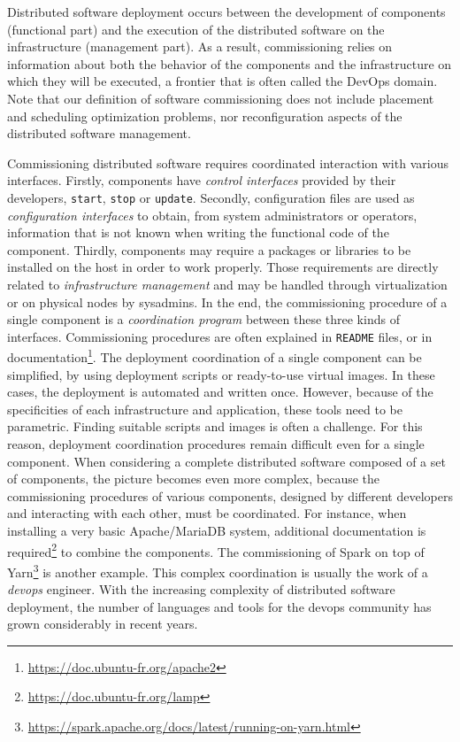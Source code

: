Distributed software deployment occurs between the development of
components (functional part) and the execution of the distributed
software on the infrastructure (management part). As a result,
commissioning relies on information about both the behavior of the
components and the infrastructure on which they will be executed, a
frontier that is often called the DevOps domain. Note that our
definition of software commissioning does not include placement and
scheduling optimization problems, nor reconfiguration aspects of the
distributed software management.


Commissioning distributed software requires coordinated interaction
with various interfaces. Firstly, components have \emph{control
  interfaces} provided by their developers, \eg \texttt{start},
\texttt{stop} or \texttt{update}. Secondly, configuration files are
used as \emph{configuration interfaces} to obtain, from system
administrators or operators, information that is not known when
writing the functional code of the component. Thirdly, components may
require a packages or libraries to be installed on the host in order
to work properly. Those requirements are directly related to
\emph{infrastructure management} and may be handled through
virtualization or on physical nodes by sysadmins.
%
In the end, the commissioning procedure of a single component is a
\emph{coordination program} between these three kinds of
interfaces. Commissioning procedures are often explained in
\texttt{README} files, or in
documentation\footnote{\url{https://doc.ubuntu-fr.org/apache2}}. The
deployment coordination of a single component can be simplified, \eg
by using deployment scripts or ready-to-use virtual images. In these
cases, the deployment is automated and written once. However, because
of the specificities of each infrastructure and application, these
tools need to be parametric. Finding suitable scripts and images is
often a challenge. For this reason, deployment coordination procedures
remain difficult even for a single component.
%
When considering a complete distributed software composed of a set of
components, the picture becomes even more complex, because the
commissioning procedures of various components, designed by different
developers and interacting with each other, must be coordinated. For
instance, when installing a very basic Apache/MariaDB system,
additional documentation is
required\footnote{\url{https://doc.ubuntu-fr.org/lamp}} to combine the
components. The commissioning of Spark on top of
Yarn\footnote{\url{https://spark.apache.org/docs/latest/running-on-yarn.html}}
is another example.
%
This complex coordination is usually the work of a \emph{devops}
engineer. With the increasing complexity of distributed software
deployment, the number of languages and tools for the devops community
has grown considerably in recent years.

